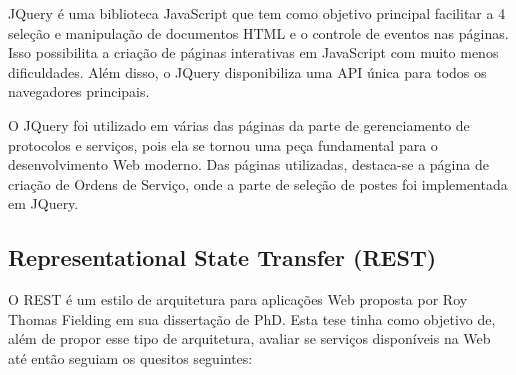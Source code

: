 \documentclass[
	article,			%
	11pt,				%
	oneside,			%
	a4paper,			%
	english,			%
	brazil,				%
	sumario=tradicional
	]{abntex2}
\begin{document}
JQuery é uma biblioteca JavaScript que tem como objetivo principal facilitar a 4
seleção e manipulação de documentos HTML e o controle de eventos nas páginas.
Isso possibilita a criação de páginas interativas em JavaScript com muito menos
dificuldades. Além disso, o JQuery disponibiliza uma API única para todos os
navegadores principais. \cite{jquery}

O JQuery foi utilizado em várias das páginas da parte de gerenciamento de
protocolos e serviços, pois ela se tornou uma peça fundamental para o
desenvolvimento Web moderno. Das páginas utilizadas, destaca-se a página de
criação de Ordens de Serviço, onde a parte de seleção de postes foi
implementada em JQuery.


\subsection{Representational State Transfer (REST)}

O REST é um estilo de arquitetura para aplicações Web proposta por Roy Thomas
Fielding em sua dissertação de PhD. \cite{fielding} Esta tese tinha como objetivo de,
além de propor esse tipo de arquitetura, avaliar se serviços disponíveis na Web
até então seguiam os quesitos seguintes:
\end{document}
